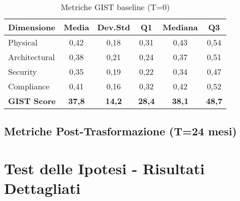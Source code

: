 \begin{table}[htbp]
\centering
\caption{Metriche GIST baseline (T=0)}
\label{tab:metriche_baseline}
\begin{tabular}{lccccc}
\toprule
\textbf{Dimensione} & \textbf{Media} & \textbf{Dev.Std} & \textbf{Q1} & \textbf{Mediana} & \textbf{Q3} \\
\midrule
Physical & 0,42 & 0,18 & 0,31 & 0,43 & 0,54 \\
Architectural & 0,38 & 0,21 & 0,24 & 0,37 & 0,51 \\
Security & 0,35 & 0,19 & 0,22 & 0,34 & 0,47 \\
Compliance & 0,41 & 0,16 & 0,32 & 0,42 & 0,52 \\
\midrule
\textbf{GIST Score} & \textbf{37,8} & \textbf{14,2} & \textbf{28,4} & \textbf{38,1} & \textbf{48,7} \\
\bottomrule
\end{tabular}
\end{table}

\subsection{\texorpdfstring{Metriche Post-Trasformazione (T=24 mesi)}{B.1.3 - Metriche Post-Trasformazione (T=24 mesi)}}

\begin{table}[htbp]
\centering
\caption{Metriche GIST post-trasformazione e variazioni percentuali}
\label{tab:metriche_post}
\end{table}

\section{\texorpdfstring{Test delle Ipotesi - Risultati Dettagliati}{B.2 - Test delle Ipotesi - Risultati Dettagliati}}

